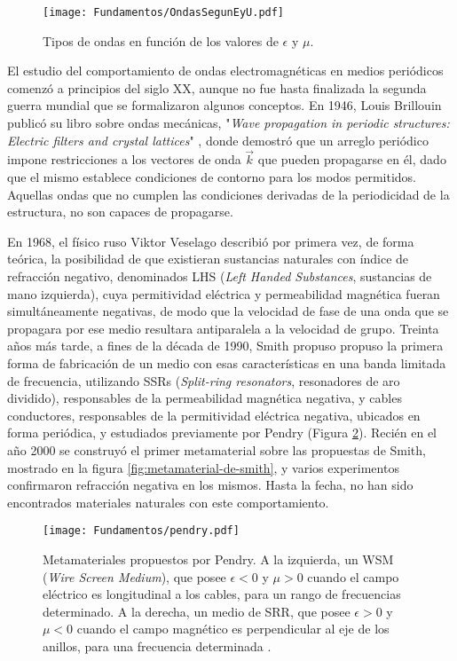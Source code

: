 \begin{figure}[htp]
	\centering
	\texttt{[image: Fundamentos/OndasSegunEyU.pdf]}
	\caption{Tipos de ondas en función de los valores de $\epsilon$ y $\mu$.}
	\label{fig:tablamuepsilon}
\end{figure}

El estudio del comportamiento de ondas electromagnéticas en medios periódicos comenzó a principios del siglo XX, aunque no fue hasta finalizada la segunda guerra mundial que se formalizaron algunos conceptos. En 1946, Louis Brillouin publicó su libro sobre ondas mecánicas, "\textit{Wave propagation in periodic structures: Electric filters and crystal lattices}" \cite{Brillouin:WavePropagation}, donde demostró que un arreglo periódico impone restricciones a los vectores de onda $\vec{k}$ que pueden propagarse en él, dado que el mismo establece condiciones de contorno para los modos permitidos. Aquellas ondas que no cumplen las condiciones derivadas de la periodicidad de la estructura, no son capaces de propagarse.

En 1968, el físico ruso Viktor Veselago describió por primera vez, de forma teórica, la posibilidad de que existieran sustancias naturales con índice de refracción negativo, denominados LHS (\textit{Left Handed Substances}, sustancias de mano izquierda), cuya permitividad eléctrica y permeabilidad magnética fueran simultáneamente negativas, de modo que la velocidad de fase de una onda que se propagara por ese medio resultara antiparalela a la velocidad de grupo. Treinta años más tarde, a fines de la década de 1990, Smith propuso propuso la primera forma de fabricación de un medio con esas características en una banda limitada de frecuencia, utilizando SSRs (\textit{Split-ring resonators}, resonadores de aro dividido), responsables de la permeabilidad magnética negativa, y cables conductores, responsables de la permitividad eléctrica negativa, ubicados en forma periódica, y estudiados previamente por Pendry (Figura \ref{fig:Pendry}). Recién en el año 2000 se construyó el primer metamaterial sobre las propuestas de Smith, mostrado en la figura \ref{fig:metamaterial-de-smith}, y varios experimentos confirmaron refracción negativa en los mismos. Hasta la fecha, no han sido encontrados materiales naturales con este comportamiento.

\begin{figure}[htp]
	\centering
	\texttt{[image: Fundamentos/pendry.pdf]}
	\caption{Metamateriales propuestos por Pendry. A la izquierda, un WSM (\textit{Wire Screen Medium}), que posee $\epsilon<0$ y $\mu>0$ cuando el campo eléctrico es longitudinal a los cables, para un rango de frecuencias determinado. A la derecha, un medio de SRR, que posee $\epsilon>0$ y $\mu<0$ cuando el campo magnético es perpendicular al eje de los anillos, para una frecuencia determinada \cite{Caloz:ElectromagneticMetamaterials}.}
	\label{fig:Pendry}
\end{figure}

